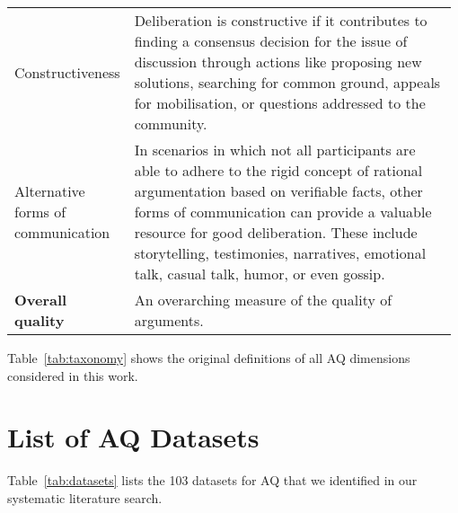 \begin{table*}[ht]
\begin{tabular*}{\linewidth}{p{0.20\linewidth}p{0.78\linewidth}}
 Constructiveness&Deliberation is constructive if it contributes to finding a consensus decision for the issue of discussion through actions like proposing new solutions, searching for common ground, appeals for mobilisation, or questions addressed to the community.\\
 Alternative forms of communication&In scenarios in which not all participants are able to adhere to the rigid concept of rational argumentation based on verifiable facts, other forms of communication can provide a valuable resource for good deliberation. These include storytelling, testimonies, narratives, emotional talk, casual talk, humor, or even gossip.\\
\midrule
\bf Overall quality&An overarching measure of the quality of arguments.\\
\bottomrule
\end{tabular*}
\caption{Taxonomy of argument quality. The definitions of the first three dimensions are taken verbatim from \citet{wachsmuth-etal-2017-computational}. The definitions of the last dimension are based on \citet{friess2015deliberation}.}
\label{tab:taxonomy} 
\end{table*}

Table~\ref{tab:taxonomy} shows the original definitions of all AQ dimensions considered in this work.

\section{List of AQ Datasets}
\label{sec:relevant-datasets}

Table~\ref{tab:datasets} lists the 103 datasets for AQ that we identified in our systematic literature search. 

\onecolumn

